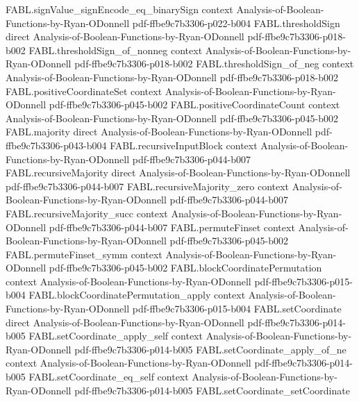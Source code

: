 \begin{theorem}
\proofstep
  {FABL.signValue_signEncode_eq_binarySign}
  {context}
  {Analysis-of-Boolean-Functions-by-Ryan-ODonnell}
  {pdf-ffbe9c7b3306-p022-b004}
\proofstep
  {FABL.thresholdSign}
  {direct}
  {Analysis-of-Boolean-Functions-by-Ryan-ODonnell}
  {pdf-ffbe9c7b3306-p018-b002}
\proofstep
  {FABL.thresholdSign_of_nonneg}
  {context}
  {Analysis-of-Boolean-Functions-by-Ryan-ODonnell}
  {pdf-ffbe9c7b3306-p018-b002}
\proofstep
  {FABL.thresholdSign_of_neg}
  {context}
  {Analysis-of-Boolean-Functions-by-Ryan-ODonnell}
  {pdf-ffbe9c7b3306-p018-b002}
\proofstep
  {FABL.positiveCoordinateSet}
  {context}
  {Analysis-of-Boolean-Functions-by-Ryan-ODonnell}
  {pdf-ffbe9c7b3306-p045-b002}
\proofstep
  {FABL.positiveCoordinateCount}
  {context}
  {Analysis-of-Boolean-Functions-by-Ryan-ODonnell}
  {pdf-ffbe9c7b3306-p045-b002}
\proofstep
  {FABL.majority}
  {direct}
  {Analysis-of-Boolean-Functions-by-Ryan-ODonnell}
  {pdf-ffbe9c7b3306-p043-b004}
\proofstep
  {FABL.recursiveInputBlock}
  {context}
  {Analysis-of-Boolean-Functions-by-Ryan-ODonnell}
  {pdf-ffbe9c7b3306-p044-b007}
\proofstep
  {FABL.recursiveMajority}
  {direct}
  {Analysis-of-Boolean-Functions-by-Ryan-ODonnell}
  {pdf-ffbe9c7b3306-p044-b007}
\proofstep
  {FABL.recursiveMajority_zero}
  {context}
  {Analysis-of-Boolean-Functions-by-Ryan-ODonnell}
  {pdf-ffbe9c7b3306-p044-b007}
\proofstep
  {FABL.recursiveMajority_succ}
  {context}
  {Analysis-of-Boolean-Functions-by-Ryan-ODonnell}
  {pdf-ffbe9c7b3306-p044-b007}
\proofstep
  {FABL.permuteFinset}
  {context}
  {Analysis-of-Boolean-Functions-by-Ryan-ODonnell}
  {pdf-ffbe9c7b3306-p045-b002}
\proofstep
  {FABL.permuteFinset_symm}
  {context}
  {Analysis-of-Boolean-Functions-by-Ryan-ODonnell}
  {pdf-ffbe9c7b3306-p045-b002}
\proofstep
  {FABL.blockCoordinatePermutation}
  {context}
  {Analysis-of-Boolean-Functions-by-Ryan-ODonnell}
  {pdf-ffbe9c7b3306-p015-b004}
\proofstep
  {FABL.blockCoordinatePermutation_apply}
  {context}
  {Analysis-of-Boolean-Functions-by-Ryan-ODonnell}
  {pdf-ffbe9c7b3306-p015-b004}
\proofstep
  {FABL.setCoordinate}
  {direct}
  {Analysis-of-Boolean-Functions-by-Ryan-ODonnell}
  {pdf-ffbe9c7b3306-p014-b005}
\proofstep
  {FABL.setCoordinate_apply_self}
  {context}
  {Analysis-of-Boolean-Functions-by-Ryan-ODonnell}
  {pdf-ffbe9c7b3306-p014-b005}
\proofstep
  {FABL.setCoordinate_apply_of_ne}
  {context}
  {Analysis-of-Boolean-Functions-by-Ryan-ODonnell}
  {pdf-ffbe9c7b3306-p014-b005}
\proofstep
  {FABL.setCoordinate_eq_self}
  {context}
  {Analysis-of-Boolean-Functions-by-Ryan-ODonnell}
  {pdf-ffbe9c7b3306-p014-b005}
\proofstep
  {FABL.setCoordinate_setCoordinate}

\end{theorem}
